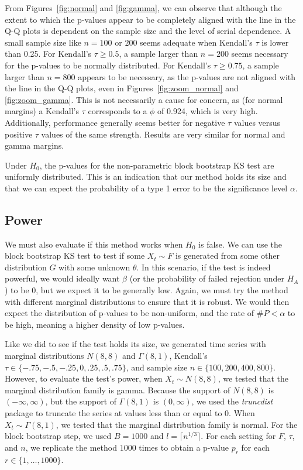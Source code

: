 \documentclass[12pt, titlepage, letterpaper]{article}
\begin{document}
{From Figures~\ref{fig:normal} and \ref{fig:gamma}, we can observe that 
although the extent to which the p-values appear to be 
completely aligned with the line
in the Q-Q plots is dependent on the sample size and the level of serial 
dependence.
A small sample size like $n = 100$ or $200$ seems adequate when Kendall's
$\tau$ is lower than 0.25. For Kendall's $\tau \geq 0.5$, a sample larger than
$n = 200$ seems necessary for the p-values to be normally distributed. For
Kendall's $\tau \geq 0.75$, a sample larger than $n = 800$ appears to be 
necessary, as the p-values are not aligned with the line in the Q-Q plots, even
in Figures~\ref{fig:zoom_normal} and \ref{fig:zoom_gamma}. This
is not necessarily a cause for concern, as (for normal margins)
a Kendall's $\tau$ corresponds to
a $\phi$ of 0.924, which is very high. Additionally, performance generally seems
better for negative $\tau$ values versus positive $\tau$ values of the same
strength. Results are very similar for normal and gamma margins.


Under $H_0$, the p-values for the non-parametric block bootstrap KS test are
uniformly distributed. This is an indication that our method 
holds its size and that we can expect the probability
of a type 1 error to be the significance level $\alpha$.


\subsection{Power}
We must also evaluate if this method works when $H_0$ is false. We can use
the block bootstrap KS test to test if some $X_t \sim F$ is generated from 
some other 
distribution $G$ with some unknown $\theta$. In this scenario, if the test is 
indeed powerful,
we would ideally want $\beta$ 
(or the probability of failed rejection under $H_A$) 
to be 0, but we
expect it to be generally low. Again, we must try the method with different
marginal distributions to ensure that it is robust.
We would then expect the distribution of p-values to be non-uniform, and the 
rate
of $\#P < \alpha$ to be high, meaning a higher density of low p-values.


Like we did to see if the test holds its size, we generated time series with 
marginal distributions $N(8, 8)$ and 
$\Gamma(8, 1)$, Kendall's $\tau \in \{-.75, -.5, -.25, 0, .25, .5, 
.75\}$, and
sample size $n \in \{100, 200, 400, 800\}$. However, 
to evaluate the test's power, when $X_t \sim N(8, 8)$, we tested that the 
marginal distribution family is gamma. Because the support of $N(8, 8)$ is
$(-\infty, \infty)$, but the support of $\Gamma(8, 1)$ is $(0, \infty)$, we used
the \textsl{truncdist} package \citep{truncdist} to truncate the series at 
values less than or equal to 0.
When $X_t \sim \Gamma(8, 1)$, we tested
that the marginal distribution family is normal. For the block bootstrap step,
we used $B = 1000$ and $l = \lceil n^{1/3} \rceil$.
For each setting for $F$, $\tau$, and $n$, we replicate the method $1000$ times 
to obtain a p-value $p_r$ for each $r \in \{1, \ldots, 1000\}$.


}
\end{document}

